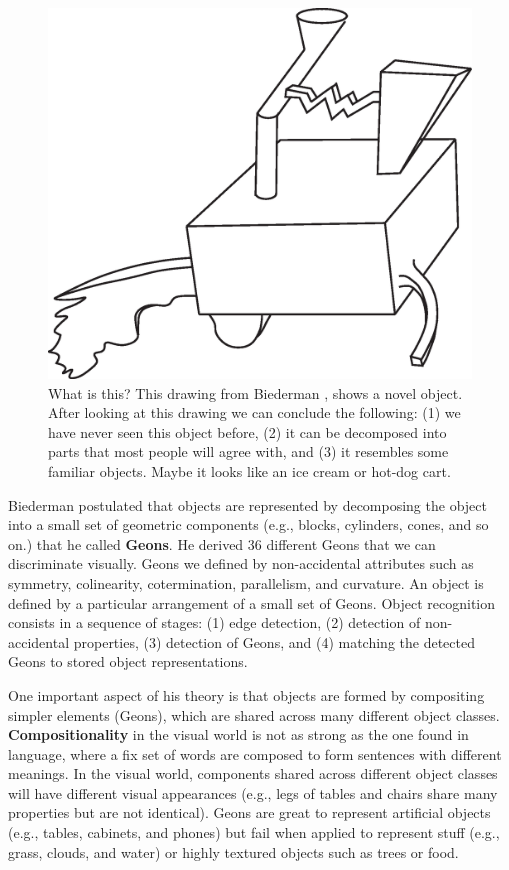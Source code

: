 \begin{figure}[t]
\centerline{
\includegraphics[width=0.5\linewidth]{figures/object_recognition/do_it_yourself.eps}
}
\caption{What is this? This drawing from Biederman \cite{Biederman1987}, shows a novel object. After looking at this drawing we can conclude the following: (1) we have never seen this object before, (2) it can be decomposed into parts that most people will agree with, and (3) it resembles some familiar objects. Maybe it looks like an ice cream or hot-dog cart.}
\label{fig:do_it_yourself}
\end{figure}

Biederman postulated that objects are represented by decomposing the object into a small set of geometric components (e.g., blocks, cylinders, cones, and so on.) that he called {\bf Geons}. He derived 36 different Geons that we can discriminate visually. Geons we defined by non-accidental attributes such as symmetry, colinearity, cotermination, parallelism, and curvature. An object is defined by a particular arrangement of a small set of Geons. Object recognition consists in a sequence of stages: (1) edge detection, (2) detection of non-accidental properties, (3) detection of Geons, and (4) matching the detected Geons to stored object representations.

One important aspect of his theory is that objects are formed by  compositing simpler elements (Geons), which are shared across many different object classes. 
{\bf Compositionality} in the visual world is not as strong as the one found in language, where a fix set of words are composed to form sentences with different meanings. In the visual world, components shared across different object classes will have different visual appearances (e.g., legs of tables and chairs share many properties but are not identical).
Geons are great to represent artificial objects (e.g., tables, cabinets, and phones) but fail when applied to represent stuff (e.g., grass, clouds, and water) or highly textured objects such as trees or food. 

